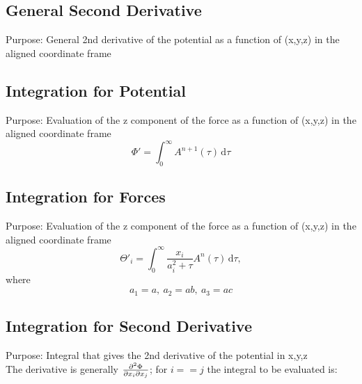 \documentclass[a4paper,11pt]{article}
\begin{document}
		\subsection{General Second Derivative}
			Purpose: General 2nd derivative of the potential as a function of (x,y,z) in the aligned coordinate frame \\
			
	
	
		\subsection{Integration for Potential}
			Purpose: Evaluation of the z component of the force as a function of (x,y,z) in the aligned coordinate frame \\
		\begin{equation}
		\Phi' = \int_{0}^{\infty} A^{n+1}(\tau)\,\mathrm{d} \tau
		\end{equation}
			
	
	
		\subsection{Integration for Forces}
			Purpose: Evaluation of the z component of the force as a function of (x,y,z) in the aligned coordinate frame \\
		\begin{equation}
		\Theta'_i = \int_0^{\infty} \frac{x_i}{a_i^2 + \tau} A^{n}(\tau)\,\mathrm{d} \tau,
		\end{equation}
		where
		\begin{equation}
		a_1 = a,~ a_2 = ab,~a_3 = ac
		\end{equation}
		
			
	
		
		\subsection{Integration for Second Derivative}
			Purpose: Integral that gives the 2nd derivative of the potential in x,y,z \\
			
			\noindent The derivative is generally $ \pdv{\Phi}{x_i}{x_j} $; for $ i==j $ the integral to be evaluated is: 
			
\end{document}
